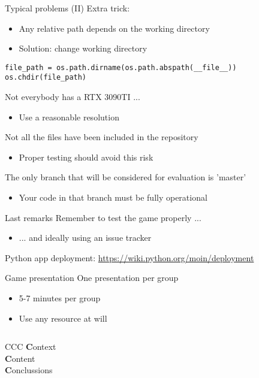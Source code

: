 \documentclass[10pt,compress]{beamer} %
\begin{document}
\begin{frame}[fragile]{Typical problems (II)}
    Extra trick:
    \begin{itemize}
        \item Any relative path depends on the working directory
        \item Solution: change working directory
    \end{itemize}

    \begin{block}{}
    \begin{verbatim}
file_path = os.path.dirname(os.path.abspath(__file__))
os.chdir(file_path)
\end{verbatim}
\end{block}

    Not everybody has a RTX 3090TI ...
    \begin{itemize}
        \item Use a reasonable resolution
    \end{itemize}

    Not all the files have been included in the repository
    \begin{itemize}
        \item Proper testing should avoid this risk
    \end{itemize}

    The only branch that will be considered for evaluation is 'master'
    \begin{itemize}
        \item Your code in that branch must be fully operational
    \end{itemize}
\end{frame}

\begin{frame}{Last remarks}
	Remember to test the game properly ...
	    \begin{itemize}
		    \item ... and ideally using an issue tracker
	    \end{itemize}
	\bigskip
	Python app deployment: \url{https://wiki.python.org/moin/deployment}
\end{frame}

\begin{frame}{Game presentation}
    One presentation per group
    \begin{itemize}
        \item 5-7 minutes per group
        \item Use any resource at will
    \end{itemize}

    \bigskip

    \begin{columns}
		\begin{block}{CCC}
		\textbf{C}ontext\\
		\textbf{C}ontent\\
		\textbf{C}onclussions
		\end{block}
   	\end{columns}
\end{frame}
\end{document}
